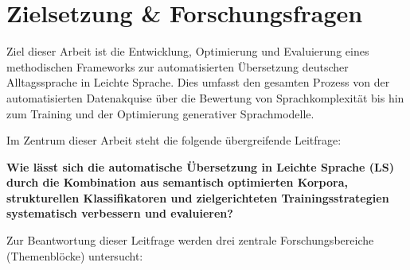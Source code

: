 \section{Zielsetzung \& Forschungsfragen}
\label{sec:zielsetzung_forschungsfragen}

Ziel dieser Arbeit ist die Entwicklung, Optimierung und Evaluierung eines methodischen Frameworks zur automatisierten Übersetzung deutscher Alltagssprache in Leichte Sprache. Dies umfasst den gesamten Prozess von der automatisierten Datenakquise über die Bewertung von Sprachkomplexität bis hin zum Training und der Optimierung generativer Sprachmodelle.

Im Zentrum dieser Arbeit steht die folgende übergreifende Leitfrage:

\begin{tcolorbox}[boxrule=0pt,sharp corners,enhanced,borderline west={2pt}{0pt}{blue}]
    \textbf{\large Wie lässt sich die automatische Übersetzung in Leichte Sprache (LS) durch die Kombination aus semantisch optimierten Korpora, strukturellen Klassifikatoren und zielgerichteten Trainingsstrategien systematisch verbessern und evaluieren?}
\end{tcolorbox}

Zur Beantwortung dieser Leitfrage werden drei zentrale Forschungsbereiche (Themenblöcke) untersucht:

